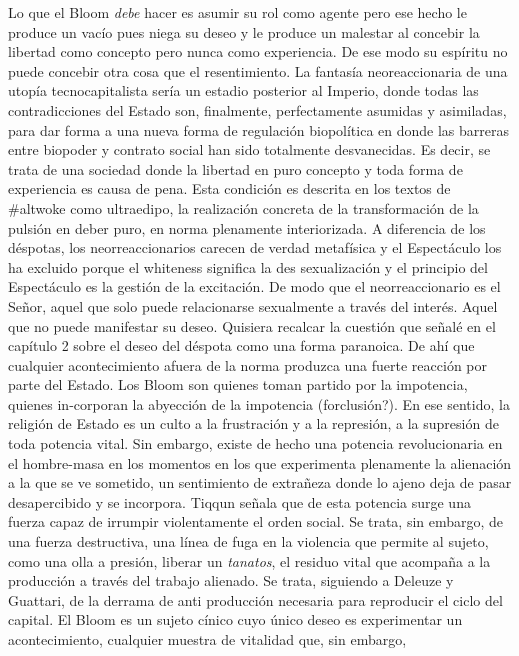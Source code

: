 \documentclass[
]{article}
\begin{document}
Lo que el Bloom \emph{debe} hacer es asumir su rol como agente pero ese
hecho le produce un vacío pues niega su deseo y le produce un malestar
al concebir la libertad como concepto pero nunca como experiencia. De
ese modo su espíritu no puede concebir otra cosa que el resentimiento.
La fantasía neoreaccionaria de una utopía tecnocapitalista sería un
estadio posterior al Imperio, donde todas las contradicciones del Estado
son, finalmente, perfectamente asumidas y asimiladas, para dar forma a
una nueva forma de regulación biopolítica en donde las barreras entre
biopoder y contrato social han sido totalmente desvanecidas. Es decir,
se trata de una sociedad donde la libertad en puro concepto y toda forma
de experiencia es causa de pena. Esta condición es descrita en los
textos de \#altwoke como ultraedipo, la realización concreta de la
transformación de la pulsión en deber puro, en norma plenamente
interiorizada. A diferencia de los déspotas, los neorreaccionarios
carecen de verdad metafísica y el Espectáculo los ha excluido porque el
whiteness significa la des sexualización y el principio del Espectáculo
es la gestión de la excitación. De modo que el neorreaccionario es el
Señor, aquel que solo puede relacionarse sexualmente a través del
interés. Aquel que no puede manifestar su deseo. Quisiera recalcar la
cuestión que señalé en el capítulo 2 sobre el deseo del déspota como una
forma paranoica. De ahí que cualquier acontecimiento afuera de la norma
produzca una fuerte reacción por parte del Estado. Los Bloom son quienes
toman partido por la impotencia, quienes in-corporan la abyección de la
impotencia (forclusión?). En ese sentido, la religión de Estado es un
culto a la frustración y a la represión, a la supresión de toda potencia
vital. Sin embargo, existe de hecho una potencia revolucionaria en el
hombre-masa en los momentos en los que experimenta plenamente la
alienación a la que se ve sometido, un sentimiento de extrañeza donde lo
ajeno deja de pasar desapercibido y se incorpora. Tiqqun señala que de
esta potencia surge una fuerza capaz de irrumpir violentamente el orden
social. Se trata, sin embargo, de una fuerza destructiva, una línea de
fuga en la violencia que permite al sujeto, como una olla a presión,
liberar un \emph{tanatos}, el residuo vital que acompaña a la producción
a través del trabajo alienado. Se trata, siguiendo a Deleuze y Guattari,
de la derrama de anti producción necesaria para reproducir el ciclo del
capital. El Bloom es un sujeto cínico cuyo único deseo es experimentar
un acontecimiento, cualquier muestra de vitalidad que, sin embargo,
\end{document}
